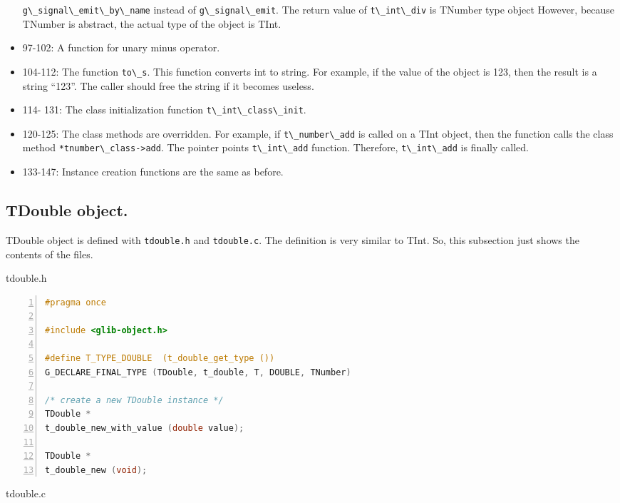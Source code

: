 \begin{itemize}
  \passthrough{\lstinline!g\_signal\_emit\_by\_name!} instead of
  \passthrough{\lstinline!g\_signal\_emit!}. The return value of
  \passthrough{\lstinline!t\_int\_div!} is TNumber type object However,
  because TNumber is abstract, the actual type of the object is TInt.
\item
  97-102: A function for unary minus operator.
\item
  104-112: The function \passthrough{\lstinline!to\_s!}. This function
  converts int to string. For example, if the value of the object is
  123, then the result is a string ``123''. The caller should free the
  string if it becomes useless.
\item
  114- 131: The class initialization function
  \passthrough{\lstinline!t\_int\_class\_init!}.
\item
  120-125: The class methods are overridden. For example, if
  \passthrough{\lstinline!t\_number\_add!} is called on a TInt object,
  then the function calls the class method
  \passthrough{\lstinline!*tnumber\_class->add!}. The pointer points
  \passthrough{\lstinline!t\_int\_add!} function. Therefore,
  \passthrough{\lstinline!t\_int\_add!} is finally called.
\item
  133-147: Instance creation functions are the same as before.
\end{itemize}

\subsection{TDouble object.}\label{tdouble-object.}

TDouble object is defined with \passthrough{\lstinline!tdouble.h!} and
\passthrough{\lstinline!tdouble.c!}. The definition is very similar to
TInt. So, this subsection just shows the contents of the files.

tdouble.h

\begin{lstlisting}[language=C, numbers=left]
#pragma once

#include <glib-object.h>

#define T_TYPE_DOUBLE  (t_double_get_type ())
G_DECLARE_FINAL_TYPE (TDouble, t_double, T, DOUBLE, TNumber)

/* create a new TDouble instance */
TDouble *
t_double_new_with_value (double value);

TDouble *
t_double_new (void);
\end{lstlisting}

tdouble.c

